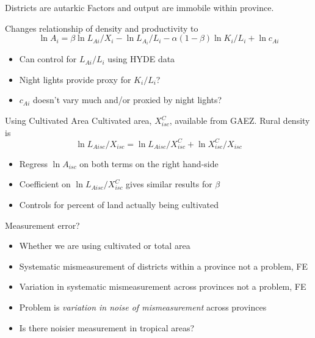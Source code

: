 \documentclass[10pt, xcolor=dvipsnames]{beamer}
\begin{document}
\begin{frame}{Districts are autarkic}\label{autarky}
Factors and output are immobile within province.

\vspace{.2cm} Changes relationship of density and productivity to
\begin{equation}
\ln A_i = \beta \ln L_{Ai}/X_i - \ln L_{A_i}/L_i - \alpha(1-\beta) \ln K_{i}/L_{i} + \ln c_{Ai} \nonumber
\end{equation}
\begin{itemize}
  \item Can control for $L_{Ai}/L_i$ using HYDE data
  \item Night lights provide proxy for $K_i/L_i$?
  \item $c_{Ai}$ doesn't vary much and/or proxied by night lights?
\end{itemize}

\hfill \hyperlink{robustness}{}
\end{frame}


\begin{frame}{Using Cultivated Area}\label{cultivated}
Cultivated area, $X^C_{isc}$, available from GAEZ. Rural density is
\begin{equation}
  \ln L_{Aisc}/X_{isc} = \ln L_{Aisc}/X^C_{isc} + \ln X^C_{isc}/X_{isc}
\end{equation}

\begin{itemize}
  \item Regress $\ln A_{isc}$ on both terms on the right hand-side 
  \item Coefficient on $\ln L_{Aisc}/X^C_{isc}$ gives similar results for $\beta$
  \item Controls for percent of land actually being cultivated
\end{itemize}

\hfill \hyperlink{land}{}
\end{frame}

\begin{frame}{Measurement error?}
\begin{itemize}
  \item Whether we are using cultivated or total area
  \item Systematic mismeasurement of districts within a province not a problem, FE
  \item Variation in systematic mismeasurement across provinces not a problem, FE
  \item Problem is \textit{variation in noise of mismeasurement} across provinces
  \item Is there noisier measurement in tropical areas? 
\end{itemize}
\end{frame}
\end{document}
